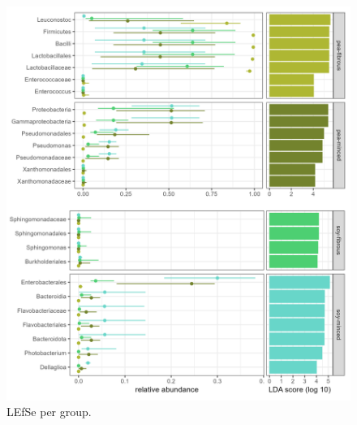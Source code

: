 \documentclass[preprint, 3p,
authoryear]{elsarticle} %
\begin{document}
\begin{figure}

{\centering \includegraphics[width=1\linewidth]{lefsestatplotdiffscales} 

}

\caption{\label{figSM4} LEfSe per group.  }\label{fig:figSM4}
\end{figure}
\end{document}
